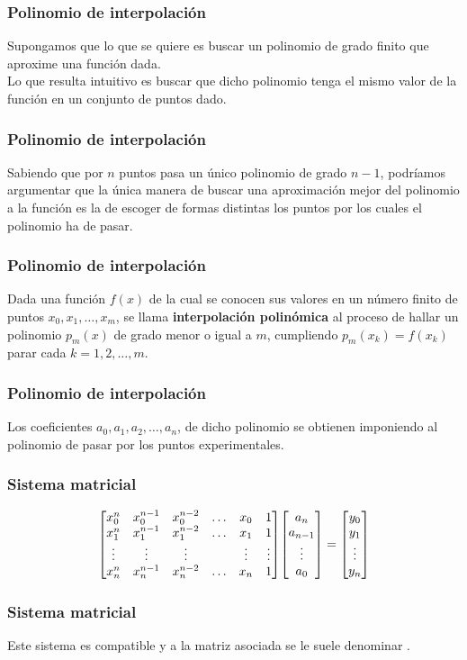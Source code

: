 \documentclass[12pt]{beamer}
\begin{document}
\begin{frame}
\frametitle{Polinomio de interpolación}
Supongamos que lo que se quiere es buscar un polinomio de grado finito que aproxime una función dada.
\\
\bigskip
\pause
Lo que resulta intuitivo es buscar que dicho polinomio tenga el mismo valor de la función en un conjunto de puntos dado.
\end{frame}
\begin{frame}
\frametitle{Polinomio de interpolación}
Sabiendo que por $n$ puntos pasa un único polinomio de grado $n-1$, podríamos argumentar que la única manera de buscar una aproximación mejor del polinomio a la función es la de escoger de formas distintas los puntos por los cuales el polinomio ha de pasar.
\end{frame}
\begin{frame}
\frametitle{Polinomio de interpolación}
Dada una función $f(x)$ de la cual se conocen sus valores en un número finito de puntos $x_{0}, x_{1}, \ldots, x_{m}$, \pause se llama \textbf{\textcolor{red(ncs)}{interpolación polinómica}} al proceso de hallar un polinomio $p_{m}(x)$ de grado menor o igual a $m$, cumpliendo $p_{m}(x_{k}) = f(x_{k})$ parar cada $k = 1, 2, \ldots, m$.
\end{frame}
\begin{frame}
\frametitle{Polinomio de interpolación}
Los coeficientes $a_{0}, a_{1}, a_{2}, \ldots, a_{n}$, de dicho polinomio se obtienen imponiendo al polinomio de pasar por los puntos experimentales.
\end{frame}
\begin{frame}
\frametitle{Sistema matricial}
\begin{align*}
\mqty[
x_{0}^{n} & x_{0}^{n-1} & x_{0}^{n-2} & \ldots & x_{0} & 1 \\
x_{1}^{n} & x_{1}^{n-1} & x_{1}^{n-2} & \ldots & x_{1} & 1 \\
\vdots & \vdots & \vdots & & \vdots & \vdots \\
x_{n}^{n} & x_{n}^{n-1} & x_{n}^{n-2} & \ldots & x_{n} & 1 
]
\mqty[
a_{n} \\ a_{n-1} \\ \vdots \\ a_{0}
]
=
\mqty[
y_{0} \\ y_{1} \\ \vdots \\ y_{n}
]
\end{align*}
\end{frame}
\begin{frame}
\frametitle{Sistema matricial}
Este sistema es compatible y a la matriz asociada se le suele denominar .
\end{frame}
\end{document}
